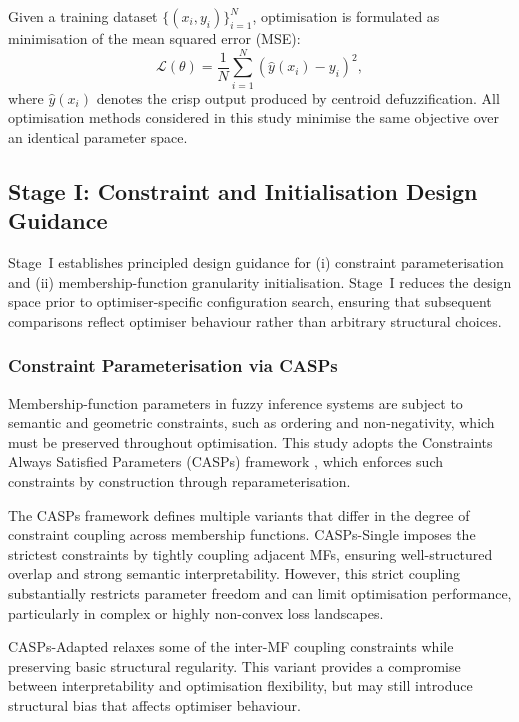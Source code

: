 \documentclass[a4paper,12pt,oneside]{article}
\begin{document}
Given a training dataset $\{(x_i, y_i)\}_{i=1}^{N}$, optimisation is formulated
as minimisation of the mean squared error (MSE):
\begin{equation}
\mathcal{L}(\theta)
=
\frac{1}{N}
\sum_{i=1}^{N}
\left( \hat{y}(x_i) - y_i \right)^2 ,
\end{equation}
where $\hat{y}(x_i)$ denotes the crisp output produced by centroid
defuzzification.
All optimisation methods considered in this study minimise the same objective
over an identical parameter space.

\subsection{Stage I: Constraint and Initialisation Design Guidance}

Stage~I establishes principled design guidance for
(i) constraint parameterisation and
(ii) membership-function granularity initialisation.
Stage~I reduces the design space prior to optimiser-specific
configuration search, ensuring that subsequent comparisons reflect optimiser
behaviour rather than arbitrary structural choices.

\subsubsection{Constraint Parameterisation via CASPs}

Membership-function parameters in fuzzy inference systems are subject to semantic
and geometric constraints, such as ordering and non-negativity, which must be
preserved throughout optimisation.
This study adopts the Constraints Always Satisfied Parameters (CASPs) framework
\cite{chen2025casp}, which enforces such constraints by construction through
reparameterisation.

The CASPs framework defines multiple variants that differ in the degree of
constraint coupling across membership functions.
CASPs-Single imposes the strictest constraints by tightly coupling adjacent MFs,
ensuring well-structured overlap and strong semantic interpretability.
However, this strict coupling substantially restricts parameter freedom and can
limit optimisation performance, particularly in complex or highly non-convex
loss landscapes.

CASPs-Adapted relaxes some of the inter-MF coupling constraints while preserving
basic structural regularity.
This variant provides a compromise between interpretability and optimisation
flexibility, but may still introduce structural bias that affects optimiser
behaviour.
\end{document}
